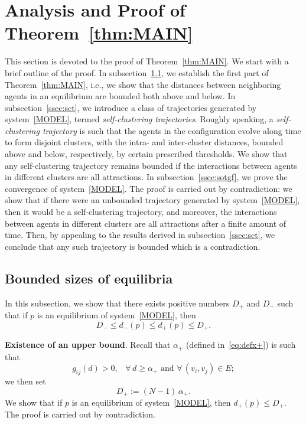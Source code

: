 \documentclass[10pt,twocolumn,twoside]{IEEEtran}
\renewcommand{\(}{\left (}
\renewcommand{\)}{\right )}
\renewcommand{\;}{\,;\,}
\begin{document}
\section{Analysis and Proof of Theorem~\ref{thm:MAIN}}\label{sec:cgf}
This section is devoted to the proof of Theorem~\ref{thm:MAIN}.   We start with a brief outline of the proof.  In subsection~\ref{sec:BSE}, we establish the first part of Theorem~\ref{thm:MAIN}, i.e., we show that the distances between neighboring agents in an equilibrium are bounded both above and below.   
In subsection~\ref{ssec:sct}, we introduce a class of trajectories generated by system~\eqref{MODEL}, termed {\it self-clustering trajectories}. 
Roughly speaking, a {\it self-clustering trajectory} is such that the agents in the configuration evolve along time to  form disjoint clusters, with the intra- and inter-cluster distances, bounded above and below, respectively, by certain prescribed thresholds.  We show that any self-clustering trajectory remains bounded if the interactions between agents in different clusters  are all attractions. 
In subsection~\ref{ssec:sotgf}, we prove  the convergence of system~\eqref{MODEL}. The proof is carried out by contradiction: we show that if there were an unbounded trajectory generated by system~\eqref{MODEL}, then it would be a self-clustering trajectory, and moreover, the interactions between agents in different clusters are all attractions after a finite amount of time. Then, by appealing to the results derived in subsection~\ref{ssec:sct}, we conclude that any such trajectory is bounded which is a contradiction. 


\subsection{Bounded sizes of equilibria}\label{sec:BSE}

 
In this subsection, we show that there exists positive numbers  $D_+$ and $D_-$ such that if $p$ is an equilibrium of system~\eqref{MODEL}, then
\begin{equation}\label{D-dpD+}
D_- \le d_-(p) \le d_+(p) \le D_+.
\end{equation}






\vspace{3pt}
\noindent
{\bf Existence of an upper bound}. Recall that $\alpha_+$ (defined in~\eqref{eq:defx+}) is such that 
\begin{equation*}
g_{ij}(d) > 0, \hspace{10pt} \forall \, d \ge \alpha_+ \mbox{ and } \forall\, (v_i,v_j)\in E;  
\end{equation*}
we then set 
\begin{equation}\label{eq:eqfirstdefD+}
D_+ := (N - 1)\,\alpha_+.
\end{equation}  
We show that if $p$ is an equilibrium of system~\eqref{MODEL}, then $d_+(p) \le D_+$. 
The proof is carried out by contradiction. 
\end{document}
